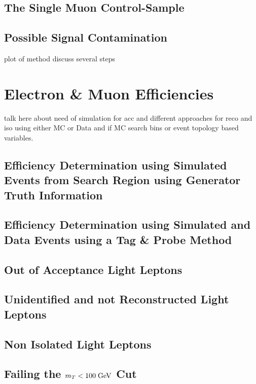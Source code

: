 \subsection{The Single Muon Control-Sample}
\subsection{Possible Signal Contamination}

plot of method discuss several steps
\section{Electron \& Muon Efficiencies}
\todo talk here about need of simulation for acc and different approaches for reco and iso using either MC or Data and if MC search bins or event topology based variables.
\subsection{Efficiency Determination using Simulated Events from Search Region using Generator Truth Information}
\label{sec:Lost_Lepton_8TeV_Efficiencies_Truth}
\subsection{Efficiency Determination using Simulated and Data Events using a Tag \& Probe Method}
\label{sec:Lost_Lepton_8TeV_Tag_Probe}

\subsection{Out of Acceptance Light Leptons}
\label{sec:Lost_Lepton_8TeV_Acc}

\subsection{Unidentified and not Reconstructed Light Leptons}
\label{sec:Lost_Lepton_8TeV_Reco}

\subsection{Non Isolated Light Leptons}
\label{sec:Lost_Lepton_8TeV_Iso}

\subsection{Failing the $m_{T}<100\;\text{Ge}\kern-0.06667em\text{V}$ Cut}
\label{sec:Lost_Lepton_8TeV_MTCut}

